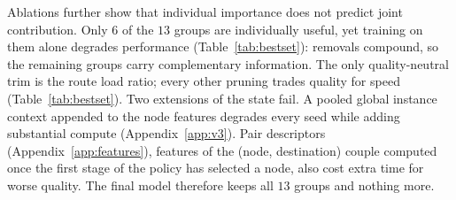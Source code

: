 \documentclass[letterpaper]{article} %
\begin{document}
Ablations further show that individual importance does not predict joint
contribution. Only $6$ of the $13$ groups are individually useful, yet
training on them alone degrades performance (Table~\ref{tab:bestset}):
removals compound, so the remaining groups carry complementary
information. The only quality-neutral trim is the route load ratio; every
other pruning trades quality for speed (Table~\ref{tab:bestset}). Two
extensions of the state fail. A pooled global instance context appended
to the node features degrades every seed while adding substantial
compute (Appendix~\ref{app:v3}). Pair descriptors (Appendix~\ref{app:features}), features of the
(node, destination) couple computed once the first stage of the policy
has selected a node, also cost extra time for worse quality. The final model therefore keeps all $13$
groups and nothing more.


\end{document}
